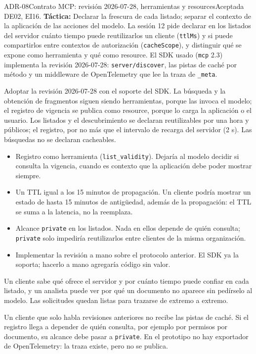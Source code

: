 \begin{adr}{ADR-08}{Contrato MCP: revisión 2026-07-28, herramientas y resources}{Aceptada}
 DE02, EI16. \textbf{Táctica:} Declarar la frescura de cada listado; separar el contexto de la aplicación de las acciones del modelo.
La sesión 12 pide declarar en los listados del servidor cuánto tiempo puede reutilizarlos un cliente (\texttt{ttlMs}) y si puede compartirlos entre contextos de autorización (\texttt{cacheScope}), y distinguir qué se expone como herramienta y qué como resource. El SDK usado (\texttt{mcp} 2.3) implementa la revisión 2026-07-28: \texttt{server/discover}, las pistas de caché por método y un middleware de OpenTelemetry que lee la traza de \texttt{\_meta}.

Adoptar la revisión 2026-07-28 con el soporte del SDK. La búsqueda y la obtención de fragmentos siguen siendo herramientas, porque las invoca el modelo; el registro de vigencia se publica como resource, porque lo carga la aplicación o el usuario. Los listados y el descubrimiento se declaran reutilizables por una hora y públicos; el registro, por no más que el intervalo de recarga del servidor (2 s). Las búsquedas no se declaran cacheables.

\begin{itemize}
  \item Registro como herramienta (\texttt{list\_validity}). Dejaría al modelo decidir si consulta la vigencia, cuando es contexto que la aplicación debe poder mostrar siempre.
  \item Un TTL igual a los 15 minutos de propagación. Un cliente podría mostrar un estado de hasta 15 minutos de antigüedad, además de la propagación: el TTL se suma a la latencia, no la reemplaza.
  \item Alcance \texttt{private} en los listados. Nada en ellos depende de quién consulta; \texttt{private} solo impediría reutilizarlos entre clientes de la misma organización.
  \item Implementar la revisión a mano sobre el protocolo anterior. El SDK ya la soporta; hacerlo a mano agregaría código sin valor.
\end{itemize}

Un cliente sabe qué ofrece el servidor y por cuánto tiempo puede confiar en cada listado, y un analista puede ver por qué un documento no aparece sin pedírselo al modelo. Las solicitudes quedan listas para trazarse de extremo a extremo.

Un cliente que solo habla revisiones anteriores no recibe las pistas de caché. Si el registro llega a depender de quién consulta, por ejemplo por permisos por documento, su alcance debe pasar a \texttt{private}. En el prototipo no hay exportador de OpenTelemetry: la traza existe, pero no se publica.
\end{adr}
